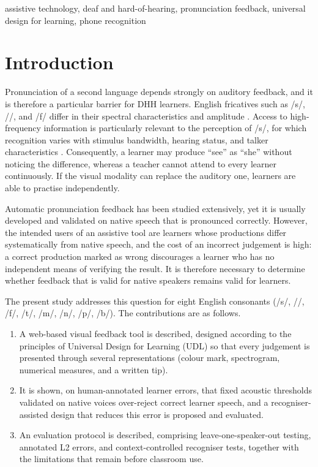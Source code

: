 \documentclass[conference]{IEEEtran}
\newcommand{\ipa}[1]{/#1/}
\begin{document}
\begin{IEEEkeywords}
assistive technology, deaf and hard-of-hearing, pronunciation feedback, universal design for learning, phone recognition
\end{IEEEkeywords}

\section{Introduction}
Pronunciation of a second language depends strongly on auditory feedback, and it is therefore a particular barrier for DHH learners. English fricatives such as /s/, //, and /f/ differ in their spectral characteristics and amplitude \cite{jongman2000}. Access to high-frequency information is particularly relevant to the perception of /s/, for which recognition varies with stimulus bandwidth, hearing status, and talker characteristics \cite{stelmachowicz2001}. Consequently, a learner may produce ``see'' as ``she'' without noticing the difference, whereas a teacher cannot attend to every learner continuously. If the visual modality can replace the auditory one, learners are able to practise independently.

Automatic pronunciation feedback has been studied extensively, yet it is usually developed and validated on native speech that is pronounced correctly. However, the intended users of an assistive tool are learners whose productions differ systematically from native speech, and the cost of an incorrect judgement is high: a correct production marked as wrong discourages a learner who has no independent means of verifying the result. It is therefore necessary to determine whether feedback that is valid for native speakers remains valid for learners.

The present study addresses this question for eight English consonants (\ipa{s}, \ipa{\textesh}, \ipa{f}, \ipa{t\textesh}, \ipa{m}, \ipa{n}, \ipa{p}, \ipa{b}). The contributions are as follows.
\begin{enumerate}
\item A web-based visual feedback tool is described, designed according to the principles of Universal Design for Learning (UDL) so that every judgement is presented through several representations (colour mark, spectrogram, numerical measures, and a written tip).
\item It is shown, on human-annotated learner errors, that fixed acoustic thresholds validated on native voices over-reject correct learner speech, and a recogniser-assisted design that reduces this error is proposed and evaluated.
\item An evaluation protocol is described, comprising leave-one-speaker-out testing, annotated L2 errors, and context-controlled recogniser tests, together with the limitations that remain before classroom use.
\end{enumerate}
\end{document}
